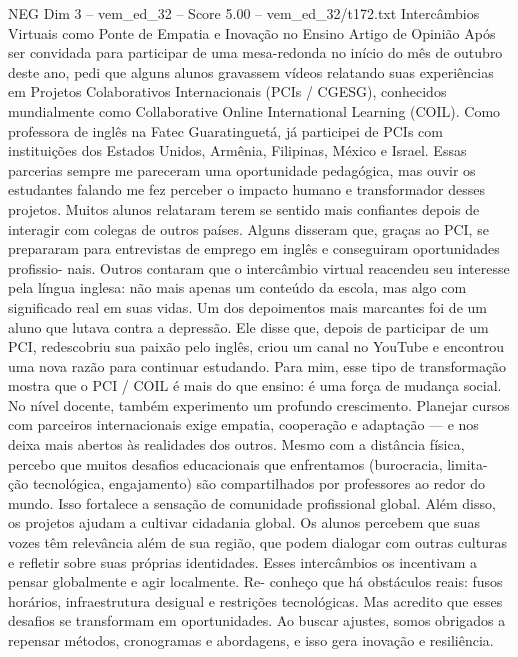 \begin{textsample}{NEG Dim 3 – vem\_ed\_32 – Score 5.00 – vem\_ed\_32/t172.txt}  \label{ex:f3_neg_149}
Intercâmbios Virtuais como Ponte de Empatia e Inovação no Ensino Artigo de Opinião Após ser convidada para participar de uma mesa-redonda no início do mês de outubro deste ano, pedi que alguns alunos gravassem vídeos relatando suas experiências em Projetos Colaborativos Internacionais (PCIs / CGESG), conhecidos mundialmente como Collaborative Online International Learning (COIL).
Como professora de inglês na Fatec Guaratinguetá, já participei de PCIs com instituições dos Estados Unidos, Armênia, Filipinas, México e Israel.
Essas parcerias sempre me pareceram uma oportunidade pedagógica, mas ouvir os estudantes falando me fez perceber o impacto humano e transformador desses projetos.
Muitos alunos relataram terem se sentido mais confiantes depois de interagir com colegas de outros países.
Alguns disseram que, graças ao PCI, se prepararam para entrevistas de emprego em inglês e conseguiram oportunidades profissio- nais.
Outros contaram que o intercâmbio virtual reacendeu seu interesse pela língua inglesa: não mais apenas um conteúdo da escola, mas algo com significado real em suas vidas.
Um dos depoimentos mais marcantes foi de um aluno que lutava contra a depressão.
Ele disse que, depois de participar de um PCI, redescobriu sua paixão pelo inglês, criou um canal no YouTube e encontrou uma nova razão para continuar estudando.
Para mim, esse tipo de transformação mostra que o PCI / COIL é mais do que ensino: é uma força de mudança social.
No nível docente, também experimento um profundo crescimento.
Planejar cursos com parceiros internacionais exige empatia, cooperação e adaptação — e nos deixa mais abertos às realidades dos outros.
Mesmo com a distância física, percebo que muitos desafios educacionais que enfrentamos (burocracia, limita- ção tecnológica, engajamento) são compartilhados por professores ao redor do mundo.
Isso fortalece a sensação de comunidade profissional global.
Além disso, os projetos ajudam a cultivar cidadania global.
Os alunos percebem que suas vozes têm relevância além de sua região, que podem dialogar com outras culturas e refletir sobre suas próprias identidades.
Esses intercâmbios os incentivam a pensar globalmente e agir localmente.
Re- conheço que há obstáculos reais: fusos horários, infraestrutura desigual e restrições tecnológicas.
Mas acredito que esses desafios se transformam em oportunidades.
Ao buscar ajustes, somos obrigados a repensar métodos, cronogramas e abordagens, e isso gera inovação e resiliência.

\end{textsample}
